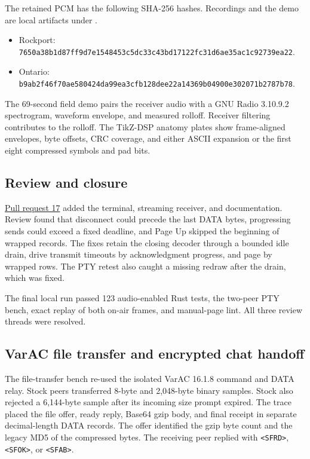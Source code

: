 \documentclass[11pt,a4paper]{article}
\newcommand{\pathtext}[1]{\path{#1}}
\newcommand{\hashtext}[4]{\texttt{\small #1\allowbreak{}#2\allowbreak{}#3\allowbreak{}#4}}
\begin{document}
\begin{samepage}
The retained PCM has the following SHA-256 hashes. Recordings and the
demo are local artifacts under \pathtext{docs/build/chat/}.
\begin{itemize}[leftmargin=*]
  \item Rockport: \hashtext{7650a38b1d87ff9d}{7e1548453c5dc33c}{43bd17122fc31d6a}{e35ac1c92739ea22}.
  \item Ontario: \hashtext{b9ab2f46f70ae580}{424da99ea3cfb128}{dee22a14369b0490}{0e302071b2787b78}.
\end{itemize}
\end{samepage}

The 69-second field demo pairs the receiver audio with a GNU Radio
3.10.9.2 spectrogram, waveform envelope, and measured rolloff. Receiver
filtering contributes to the rolloff. The TikZ-DSP anatomy plates show
frame-aligned envelopes, byte offsets, CRC coverage, and either ASCII
expansion or the first eight compressed symbols and pad bits.

\subsection{Review and closure}
\href{https://github.com/8r4n/linkwise/pull/17}{Pull request 17} added
the terminal, streaming receiver, and documentation. Review found that
disconnect could precede the last DATA bytes, progressing sends could
exceed a fixed deadline, and Page Up skipped the beginning of wrapped
records. The fixes retain the closing decoder through a bounded idle
drain, drive transmit timeouts by acknowledgment progress, and page by
wrapped rows. The PTY retest also caught a missing redraw after the
drain, which was fixed.

The final local run passed 123 audio-enabled Rust tests, the two-peer PTY
bench, exact replay of both on-air frames, and manual-page lint. All three
review threads were resolved.

\subsection{VarAC file transfer and encrypted chat handoff}
The file-transfer bench re-used the isolated VarAC 16.1.8 command and
DATA relay. Stock peers transferred 8-byte and 2,048-byte binary
samples. Stock also rejected a 6,144-byte sample after its incoming
size prompt expired. The trace placed the file offer, ready reply,
Base64 gzip body, and final receipt in separate decimal-length DATA
records. The offer identified the gzip byte count and the legacy MD5
of the compressed bytes. The receiving peer replied with
\texttt{<SFRD>}, \texttt{<SFOK>}, or \texttt{<SFAB>}.
\end{document}
